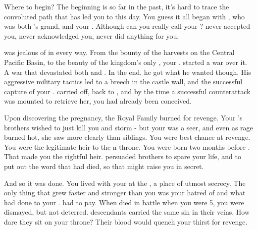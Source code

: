 \documentclass[char]{NeptuneBall}
\begin{document}
\name{\cManta{}}



Where to begin? The beginning is so far in the past, it's hard to trace the convoluted path that has led you to this day. You guess it all began with \cExExKing{\King} \cExExKing{}, who was both \cKing{\King} \cKing{}'s grand\cExExKing{\parent}, and your \cExExKing{\parent}. Although can you really call \cExExKing{\them} your \cExExKing{\parent}? \cExExKing{\They} never accepted you, never acknowledged you, never did anything for you.

\cExExKing{\They} was jealous of \pPacifica{} in every way. From the bounty of the harvests on the Central Pacific Basin, to the beauty of the kingdom's only \cMother{\prince}, your \cMother{\parent} \cMother{\MYname}. \cExExKing{} started a war over it. A war that devastated both \pPacifica{} and \pAtlantis{}. In the end, he got what he wanted though. His aggressive military tactics led to a breech in the castle wall, and the successful capture of your \cMother{\parent}. \cExExKing{} carried \cMother{\them} off, back to \pAtlantis{}, and by the time a successful counterattack was mounted to retrieve her, you had already been conceived.

Upon discovering the pregnancy, the Royal Family burned for revenge. Your \cMother{\parent}'s brothers wished to just kill you and storm \pAtlantis{} - but your \cMother{\parent} was a seer, and even as \cMother{\their} rage burned hot, she saw more clearly than \cMother{\their} siblings. You were \cMother{\their} best chance at revenge. You were the legitimate heir to the \pAtlantis{}n throne. You were born two months before \cExKing{}. That made you the rightful heir. \cMother{} persuaded \cMother{\their} brothers to spare your life, and to put out the word that \cMother{\they} had died, so that \cMother{\they} might raise you in secret.

And so it was done. You lived with your \cMother{\parent} at the \pAssassin{}, a place of utmost secrecy. The only thing that grew faster and stronger than you was your hatred of \cExExKing{} and what had done to your \cMother{\parent}. \cExExKing{} had to pay. When \cExExKing{\they} died in battle when you were 5, you were dismayed, but not deterred. \cExExKing{\Their} descendants carried the same sin in their veins. How dare they sit on your throne? Their blood would quench your thirst for revenge. 
\end{document}
